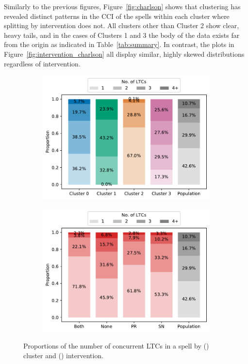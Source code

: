 \documentclass[11pt]{article}
\newlength{\imgwidth}
\begin{document}
Similarly to the previous figures, Figure~\ref{fig:charlson} shows that
clustering has revealed distinct patterns in the CCI of the spells within each
cluster where splitting by intervention does not. All clusters other than
Cluster 2 show clear, heavy tails, and in the cases of Clusters 1 and 3 the body
of the data exists far from the origin as indicated in Table~\ref{tab:summary}.
In contrast, the plots in Figure~\ref{fig:intervention_charlson} all display
similar, highly skewed distributions regardless of intervention.

\begin{figure}
    \centering
    \begin{subfigure}{.5\imgwidth}
        \includegraphics[width=\linewidth]{img_cluster_ltcs}
        \caption{}\label{fig:cluster_ltcs}
    \end{subfigure}\hfill%
    \begin{subfigure}{.5\imgwidth}
        \includegraphics[width=\linewidth]{img_intervention_ltcs}
        \caption{}\label{fig:intervention_ltcs}
    \end{subfigure}
    \caption{%
        Proportions of the number of concurrent LTCs in a spell by
        () cluster and ()
        intervention.
    }\label{fig:ltcs}
\end{figure}
\end{document}
